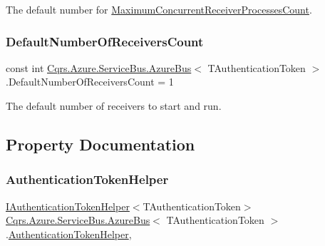 The default number for \hyperlink{classCqrs_1_1Azure_1_1ServiceBus_1_1AzureBus_a6b517888d91c6a5b026cb5857e75a04f_a6b517888d91c6a5b026cb5857e75a04f}{Maximum\+Concurrent\+Receiver\+Processes\+Count}. 

\mbox{\label{classCqrs_1_1Azure_1_1ServiceBus_1_1AzureBus_a19642a14d6cf036cbbdb68b9ba7e635d_a19642a14d6cf036cbbdb68b9ba7e635d}} 
\subsubsection{\texorpdfstring{Default\+Number\+Of\+Receivers\+Count}{DefaultNumberOfReceiversCount}}
{\footnotesize\ttfamily const int \hyperlink{classCqrs_1_1Azure_1_1ServiceBus_1_1AzureBus}{Cqrs.\+Azure.\+Service\+Bus.\+Azure\+Bus}$<$ T\+Authentication\+Token $>$.Default\+Number\+Of\+Receivers\+Count = 1\hspace{0.3cm}{\ttfamily [protected]}}



The default number of receivers to start and run. 



\subsection{Property Documentation}
\mbox{\label{classCqrs_1_1Azure_1_1ServiceBus_1_1AzureBus_a5250b75a5ef26d52a96da74777958519_a5250b75a5ef26d52a96da74777958519}} 
\subsubsection{\texorpdfstring{Authentication\+Token\+Helper}{AuthenticationTokenHelper}}
{\footnotesize\ttfamily \hyperlink{interfaceCqrs_1_1Authentication_1_1IAuthenticationTokenHelper}{I\+Authentication\+Token\+Helper}$<$T\+Authentication\+Token$>$ \hyperlink{classCqrs_1_1Azure_1_1ServiceBus_1_1AzureBus}{Cqrs.\+Azure.\+Service\+Bus.\+Azure\+Bus}$<$ T\+Authentication\+Token $>$.\hyperlink{classCqrs_1_1Authentication_1_1AuthenticationTokenHelper}{Authentication\+Token\+Helper}\hspace{0.3cm}{\ttfamily [get]}, {\ttfamily [protected]}}



